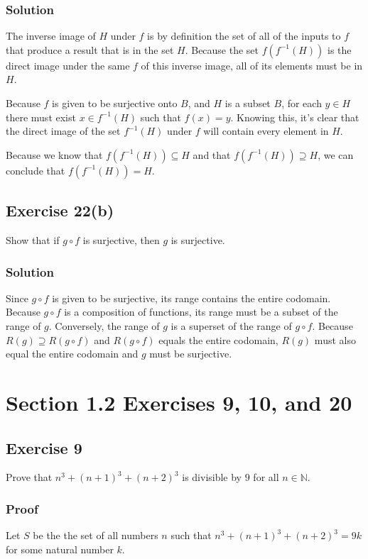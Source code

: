 \documentclass[12pt]{article}
\begin{document}
\begin{flushleft}
\subsubsection*{Solution}

The inverse image of $H$ under $f$ is by definition the set of all of the inputs to $f$ that produce a result that is in the set $H$. Because the set $f\left(f^{-1}\left(H\right)\right)$ is the direct image under the same $f$ of this inverse image, all of its elements must be in $H$.

Because $f$ is given to be surjective onto $B$, and $H$ is a subset $B$, for each $y \in H$ there must exist $x \in f^{-1}\left(H\right)$ such that $f\left(x\right) = y$. Knowing this, it's clear that the direct image of the set $f^{-1}\left(H\right)$ under $f$ will contain every element in $H$.

Because we know that $f\left(f^{-1}\left(H\right)\right) \subseteq H$ and that $f\left(f^{-1}\left(H\right)\right) \supseteq H$, we can conclude that $f\left(f^{-1}\left(H\right)\right) = H$.
\subsection*{Exercise 22(b)}
Show that if $g \circ f$ is surjective, then $g$ is surjective.
\subsubsection*{Solution}
Since $g \circ f$ is given to be surjective, its range contains the entire codomain. Because $g \circ f$ is a composition of functions, its range must be a subset of the range of $g$. Conversely, the range of $g$ is a superset of the range of $g \circ f$. Because $R\left(g\right) \supseteq R\left(g \circ f\right)$ and $R\left(g \circ f\right)$ equals the entire codomain, $R\left(g\right)$ must also equal the entire codomain and $g$ must be surjective.

\section*{Section 1.2 Exercises 9, 10, and 20}
\subsection*{Exercise 9}
Prove that $n^3 + \left(n + 1\right)^3 + \left(n + 2\right)^3$ is divisible by $9$ for all $n \in \mathbb{N}$.
\subsubsection*{Proof}
Let $S$ be the the set of all numbers $n$ such that $n^3 + \left(n + 1\right)^3 + \left(n + 2\right)^3 = 9k$ for some natural number $k$.


\end{flushleft}
\end{document}
